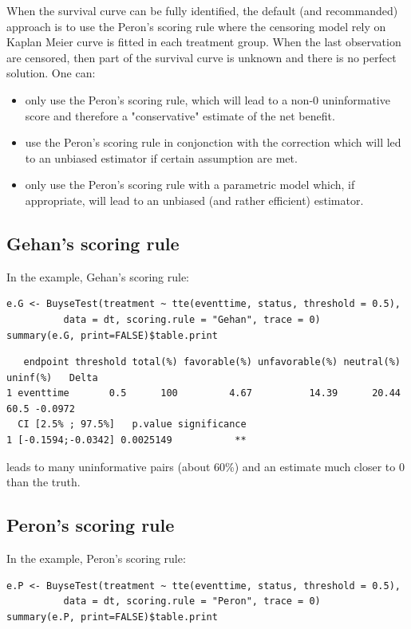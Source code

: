 \documentclass[12pt]{article}
\begin{document}
When the survival curve can be fully identified, the default (and
recommanded) approach is to use the Peron's scoring rule where the
censoring model rely on Kaplan Meier curve is fitted in each treatment
group. When the last observation are censored, then part of the
survival curve is unknown and there is no perfect solution. One can:
\begin{itemize}
\item only use the Peron's scoring rule, which will lead to a non-0
uninformative score and therefore a "conservative" estimate of the net benefit.
\item use the Peron's scoring rule in conjonction with the correction
which will led to an unbiased estimator if certain assumption are met.
\item only use the Peron's scoring rule with a parametric model which, if
appropriate, will lead to an unbiased (and rather efficient)
estimator.
\end{itemize}

\subsection{Gehan's scoring rule}
\label{sec:orgc470aea}
In the example, Gehan's scoring rule:
\lstset{language=r,label= ,caption= ,captionpos=b,numbers=none}
\begin{lstlisting}
e.G <- BuyseTest(treatment ~ tte(eventtime, status, threshold = 0.5),
          data = dt, scoring.rule = "Gehan", trace = 0)
summary(e.G, print=FALSE)$table.print
\end{lstlisting}

\begin{verbatim}
   endpoint threshold total(%) favorable(%) unfavorable(%) neutral(%) uninf(%)   Delta
1 eventtime       0.5      100         4.67          14.39      20.44     60.5 -0.0972
  CI [2.5% ; 97.5%]   p.value significance
1 [-0.1594;-0.0342] 0.0025149           **
\end{verbatim}


leads to many uninformative pairs (about 60\%) and an estimate much
closer to 0 than the truth.

\subsection{Peron's scoring rule}
\label{sec:org8acd928}
In the example, Peron's scoring rule:
\lstset{language=r,label= ,caption= ,captionpos=b,numbers=none}
\begin{lstlisting}
e.P <- BuyseTest(treatment ~ tte(eventtime, status, threshold = 0.5),
          data = dt, scoring.rule = "Peron", trace = 0)
summary(e.P, print=FALSE)$table.print
\end{lstlisting}
\end{document}
